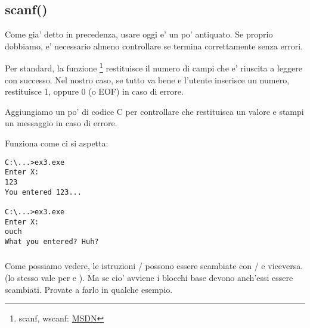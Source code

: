 \subsection{scanf()}

Come gia' detto in precedenza, usare \scanf oggi e' un po' antiquato.
Se proprio dobbiamo, e' necessario almeno controllare se \scanf termina correttamente senza errori.



Per standard, la funzione \scanf\footnote{scanf, wscanf: \href{http://go.yurichev.com/17255}{MSDN}} restituisce il numero di campi che e' riuscita a leggere con successo.
Nel nostro caso, se tutto va bene e l'utente inserisce un numero, \scanf restituisce 1, oppure 0 (o \ac{EOF}) in caso di errore. 

Aggiungiamo un po' di codice C per controllare che \scanf restituisca un valore e stampi un messaggio in caso di errore.

Funziona come ci si aspetta:

\begin{lstlisting}
C:\...>ex3.exe
Enter X:
123
You entered 123...

C:\...>ex3.exe
Enter X:
ouch
What you entered? Huh?
\end{lstlisting}






\subsubsection{\Exercise}

Come possiamo vedere, le istruzioni / possono essere scambiate con / e viceversa.
(lo stesso vale per  e ).
Ma se cio' avviene i blocchi base devono anch'essi essere scambiati. Provate a farlo in qualche esempio.


